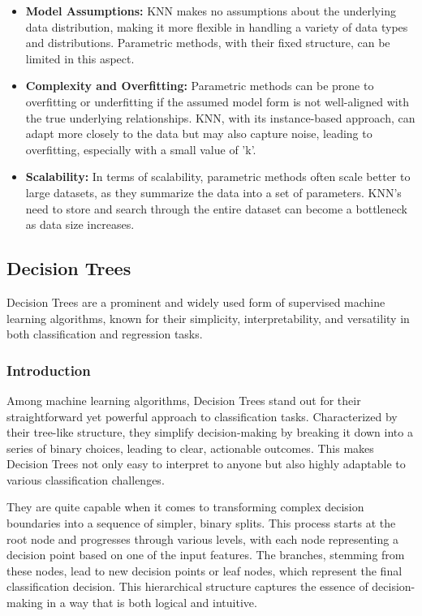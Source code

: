 \documentclass[letterpaper,10pt]{article}
\begin{document}
\begin{itemize}
    \item \textbf{Model Assumptions:} KNN makes no assumptions about the underlying data distribution, making it more flexible in handling a variety of data types and distributions. Parametric methods, with their fixed structure, can be limited in this aspect.
    \item \textbf{Complexity and Overfitting:} Parametric methods can be prone to overfitting or underfitting if the assumed model form is not well-aligned with the true underlying relationships. KNN, with its instance-based approach, can adapt more closely to the data but may also capture noise, leading to overfitting, especially with a small value of 'k'.
    \item \textbf{Scalability:} In terms of scalability, parametric methods often scale better to large datasets, as they summarize the data into a set of parameters. KNN's need to store and search through the entire dataset can become a bottleneck as data size increases.
\end{itemize}

\newpage
\subsection{Decision Trees}
Decision Trees are a prominent and widely used form of supervised machine learning algorithms, known for their simplicity, interpretability, and versatility in both classification and regression tasks. 
\subsubsection{Introduction}
Among machine learning algorithms, Decision Trees stand out for their straightforward yet powerful approach to classification tasks. Characterized by their tree-like structure, they simplify decision-making by breaking it down into a series of binary choices, leading to clear, actionable outcomes. This makes Decision Trees not only easy to interpret to anyone but also highly adaptable to various classification challenges. \par

They are quite capable when it comes to transforming complex decision boundaries into a sequence of simpler, binary splits. This process starts at the root node and progresses through various levels, with each node representing a decision point based on one of the input features. The branches, stemming from these nodes, lead to new decision points or leaf nodes, which represent the final classification decision. This hierarchical structure captures the essence of decision-making in a way that is both logical and intuitive. \par
\end{document}
